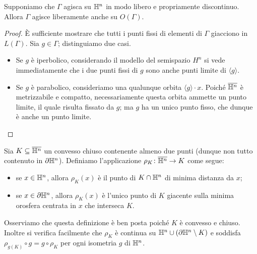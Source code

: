 \begin{proposition*}
Supponiamo che $\Gamma$ agisca su $\mathbb{H}^n$ in modo libero e propriamente discontinuo. Allora $\Gamma$ agisce liberamente anche su $O(\Gamma)$.
\end{proposition*}
\begin{proof}
È sufficiente mostrare che tutti i punti fissi di elementi di $\Gamma$ giacciono in $L(\Gamma)$. Sia $g\in\Gamma$; distinguiamo due casi.
\begin{itemize}
\item Se $g$ è iperbolico, considerando il modello del semispazio $H^n$ si vede immediatamente che i due punti fissi di $g$ sono anche punti limite di $\langle g\rangle$.
\item Se $g$ è parabolico, consideriamo una qualunque orbita $\langle g\rangle \cdot x$. Poiché $\overline{\mathbb{H}^n}$ è metrizzabile e compatto, necessariamente questa orbita ammette un punto limite, il quale risulta fissato da $g$; ma $g$ ha un unico punto fisso, che dunque è anche un punto limite.\qedhere
\end{itemize}
\end{proof}

\begin{definition*}
Sia $K\subseteq\overline{\mathbb{H}^n}$ un convesso chiuso contenente almeno due punti (dunque non tutto contenuto in $\partial\mathbb{H}^n$). Definiamo l'applicazione $\rho_K\colon\overline{\mathbb{H}^n}\to K$ come segue:
\begin{itemize}
\item se $x\in\mathbb{H}^n$, allora $\rho_K(x)$ è il punto di $K\cap\mathbb{H}^n$ di minima distanza da $x$;
\item se $x\in\partial\mathbb{H}^n$, allora $\rho_K(x)$ è l'unico punto di $K$ giacente sulla minima orosfera centrata in $x$ che interseca $K$.
\end{itemize}
\end{definition*}
Osserviamo che questa definizione è ben posta poiché $K$ è convesso e chiuso. Inoltre si verifica facilmente che $\rho_K$ è continua su $\mathbb{H}^n\cup(\partial\mathbb{H}^n\setminus K)$ e soddisfa $\rho_{g(K)}\circ g=g\circ\rho_K$ per ogni isometria $g$ di $\mathbb{H}^n$.

